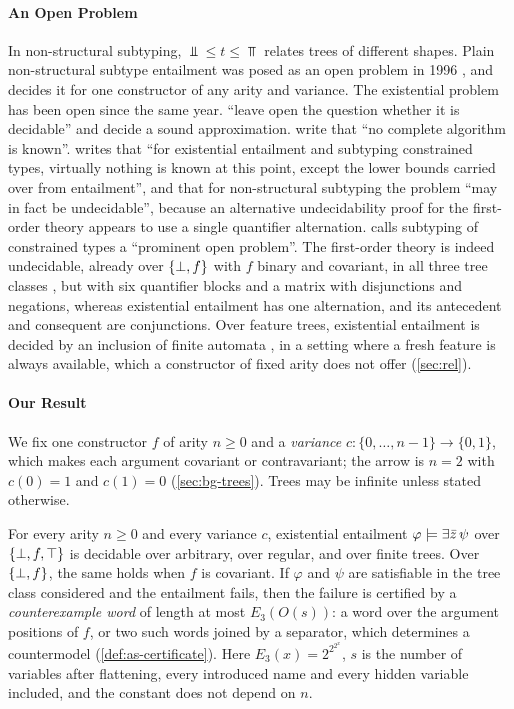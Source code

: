 \paragraph{An Open Problem}
In non-structural subtyping, $\Bot\le t\le\Top$ relates trees of different
shapes. Plain non-structural subtype entailment was posed as an open problem
in 1996 \citep{Rehof96TLCA}, and \citet{Zhao26} decides it for one
constructor of any arity and variance. The existential
problem has been open since the same year. \citet[Section~1]{TrifonovSmith96}
``leave open the question whether it is decidable'' and decide a sound
approximation. \citet[Section~3.2]{FahndrichAiken96} write that ``no complete
algorithm is known''. \citet[Section~7.2.2]{Su02} writes that ``for
existential entailment and subtyping constrained types, virtually nothing is
known at this point, except the lower bounds carried over from entailment'',
and that for non-structural subtyping the problem ``may in fact be
undecidable'', because an alternative undecidability proof for the
first-order theory appears to use a single quantifier alternation.
\citet[Section~1.4.2]{Priesnitz04} calls subtyping of constrained types a
``prominent open problem''. The first-order theory is indeed undecidable,
already over $\{\bot,f\}$ with $f$ binary and covariant, in all three tree classes
\citep{SuAikenNiehrenPriesnitzTreinen02}, but with six quantifier blocks and a
matrix with disjunctions and negations, whereas existential entailment has one
alternation, and its antecedent and consequent are conjunctions. Over feature
trees, existential entailment is decided by an inclusion of finite automata
\citep{MullerNiehrenTreinen98,MullerNiehrenTreinen01}, in a setting where a
fresh feature is always available, which a constructor of fixed arity does not
offer (\cref{sec:rel}).

\paragraph{Our Result}
We fix one constructor $f$ of arity $n\ge0$ and a \emph{variance}
$c:\{0,\ldots,n-1\}\to\{0,1\}$, which makes each argument covariant or
contravariant; the arrow is $n=2$ with $c(0)=1$ and $c(1)=0$
(\cref{sec:bg-trees}). Trees may be infinite unless stated otherwise.

\begin{theorem}\label{thm:intro-main}
For every arity $n\ge0$ and every variance $c$, existential entailment
$\varphi\models\exists\bar z\,\psi$ over $\{\bot,f,\top\}$ is decidable over arbitrary, over
regular, and over finite trees. Over $\{\bot,f\}$, the same holds when $f$ is
covariant. If $\varphi$ and $\psi$ are satisfiable in the tree class considered
and the entailment fails, then the failure is certified by a
\emph{counterexample word} of length at most $E_3(O(s))$: a word over the
argument positions of $f$, or two such words joined by a separator, which
determines a countermodel (\cref{def:as-certificate}). Here
$E_3(x)=2^{2^{2^x}}$, $s$ is the number of variables after flattening, every
introduced name and every hidden variable included, and the constant does not
depend on $n$.
\end{theorem}

